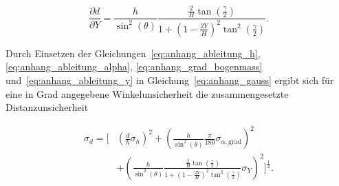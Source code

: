 \begin{equation} 
    \frac{\partial d}{\partial Y} = \frac{h}{\sin^2(\theta)} \frac{ \frac{2}{H}\tan\left(\frac{\gamma}{2}\right) }{ 1+ \left(1-\frac{2Y}{H}\right)^2 \tan^2\left(\frac{\gamma}{2}\right) }. 
    \label{eq:anhang_ableitung_y} 
\end{equation} 

Durch Einsetzen der Gleichungen~\ref{eq:anhang_ableitung_h}, \ref{eq:anhang_ableitung_alpha}, \ref{eq:anhang_grad_bogenmass} und~\ref{eq:anhang_ableitung_y} in Gleichung~\ref{eq:anhang_gauss} ergibt sich für eine in Grad angegebene Winkelunsicherheit die zusammengesetzte Distanzunsicherheit 

\begin{equation} 
    \begin{split} 
        \sigma_d = \Bigg[ &\left( \frac{d}{h}\sigma_h \right)^2 + \left( \frac{h}{\sin^2(\theta)} \frac{\pi}{180} \sigma_{\alpha,\mathrm{grad}} \right)^2 \\[0.5em] &+ \left( \frac{h}{\sin^2(\theta)} \frac{ \frac{2}{H}\tan\left(\frac{\gamma}{2}\right) }{ 1+ \left(1-\frac{2Y}{H}\right)^2 \tan^2\left(\frac{\gamma}{2}\right) } 
        \sigma_Y \right)^2 \Bigg]^{\frac{1}{2}}. 
        \label{eq:anhang_distanzunsicherheit} 
    \end{split} 
\end{equation}